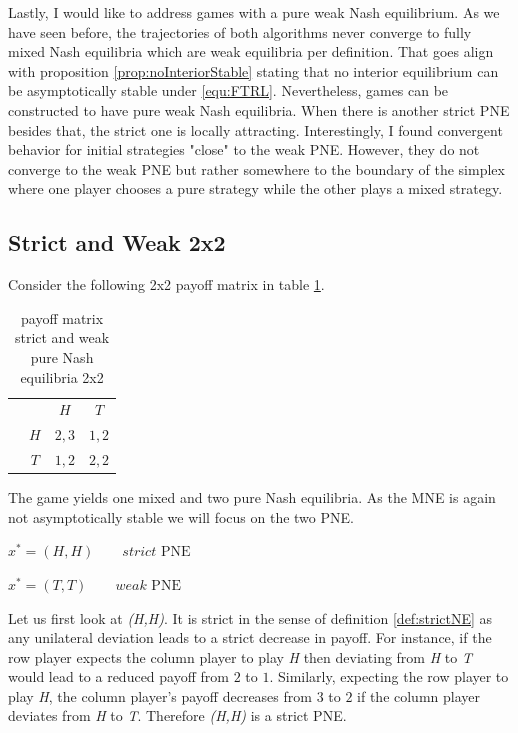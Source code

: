 Lastly, I would like to address games with a pure weak Nash equilibrium. As we have seen before, the trajectories of both algorithms never converge to fully mixed Nash equilibria which are weak equilibria per definition. That goes align with proposition \ref{prop:noInteriorStable} stating that no interior equilibrium can be asymptotically stable under \ref{equ:FTRL}. Nevertheless, games can be constructed to have pure weak Nash equilibria. When there is another strict PNE besides that, the strict one is locally attracting. Interestingly, I found convergent behavior for initial strategies "close" to the weak PNE. However, they do not converge to the weak PNE but rather somewhere to the boundary of the simplex where one player chooses a pure strategy while the other plays a mixed strategy. 

\subsection{Strict and Weak 2x2}\label{subsection:StrictAndWeak2x2}

Consider the following 2x2 payoff matrix in table \ref{tab:payoffStrictAndWeak2x2}.

\begin{table}[H]\centering
\setlength{\extrarowheight}{2pt}
\begin{tabular}{cc|c|c|}
  & \multicolumn{1}{c}{} & \multicolumn{1}{c}{$H$}  & \multicolumn{1}{c}{$T$} \\\cline{3-4}
  & $H$ & $2,3$ & $1,2$ \\\cline{3-4}
  & $T$ & $1,2$ & $2,2$ \\\cline{3-4}
\end{tabular}\caption{\label{tab:payoffStrictAndWeak2x2}payoff matrix strict and weak pure Nash equilibria 2x2}
\end{table}

The game yields one mixed and two pure Nash equilibria. As the MNE is again not asymptotically stable we will focus on the two PNE. 

\begin{description}\centering
    \item $x^{*} = (H,H) \qquad \textit{strict }\text{PNE}$
    \item $x^{*} = (T,T) \qquad \textit{weak }\text{PNE}$
\end{description}

Let us first look at \textit{(H,H)}. It is strict in the sense of definition \ref{def:strictNE} as any unilateral deviation leads to a strict decrease in payoff. For instance, if the row player expects the column player to play \textit{H} then deviating from \textit{H} to \textit{T} would lead to a reduced payoff from $2$ to $1$. Similarly, expecting the row player to play \textit{H}, the column player's payoff decreases from $3$ to $2$ if the column player deviates from \textit{H} to \textit{T}. Therefore \textit{(H,H)} is a strict PNE. \\

